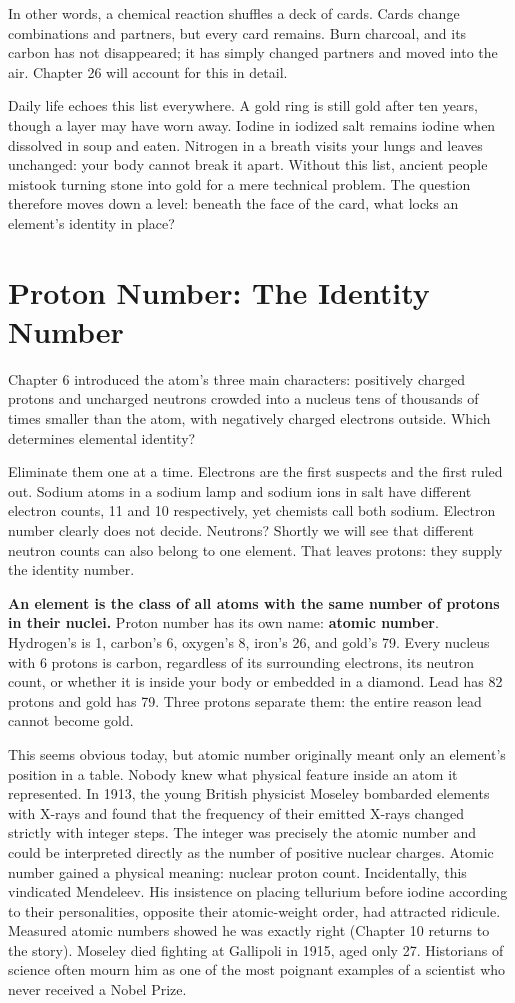 In other words, a chemical reaction shuffles a deck of cards. Cards change combinations and partners, but every card remains. Burn charcoal, and its carbon has not disappeared; it has simply changed partners and moved into the air. Chapter 26 will account for this in detail.

Daily life echoes this list everywhere. A gold ring is still gold after ten years, though a layer may have worn away. Iodine in iodized salt remains iodine when dissolved in soup and eaten. Nitrogen in a breath visits your lungs and leaves unchanged: your body cannot break it apart. Without this list, ancient people mistook turning stone into gold for a mere technical problem. The question therefore moves down a level: beneath the face of the card, what locks an element's identity in place?

\section{Proton Number: The Identity Number}

Chapter 6 introduced the atom's three main characters: positively charged protons and uncharged neutrons crowded into a nucleus tens of thousands of times smaller than the atom, with negatively charged electrons outside. Which determines elemental identity?

Eliminate them one at a time. Electrons are the first suspects and the first ruled out. Sodium atoms in a sodium lamp and sodium ions in salt have different electron counts, 11 and 10 respectively, yet chemists call both sodium. Electron number clearly does not decide. Neutrons? Shortly we will see that different neutron counts can also belong to one element. That leaves protons: they supply the identity number.

\textbf{An element is the class of all atoms with the same number of protons in their nuclei.} Proton number has its own name: \textbf{atomic number}. Hydrogen's is 1, carbon's 6, oxygen's 8, iron's 26, and gold's 79. Every nucleus with 6 protons is carbon, regardless of its surrounding electrons, its neutron count, or whether it is inside your body or embedded in a diamond. Lead has 82 protons and gold has 79. Three protons separate them: the entire reason lead cannot become gold.

This seems obvious today, but atomic number originally meant only an element's position in a table. Nobody knew what physical feature inside an atom it represented. In 1913, the young British physicist Moseley bombarded elements with X-rays and found that the frequency of their emitted X-rays changed strictly with integer steps. The integer was precisely the atomic number and could be interpreted directly as the number of positive nuclear charges. Atomic number gained a physical meaning: nuclear proton count. Incidentally, this vindicated Mendeleev. His insistence on placing tellurium before iodine according to their personalities, opposite their atomic-weight order, had attracted ridicule. Measured atomic numbers showed he was exactly right (Chapter 10 returns to the story). Moseley died fighting at Gallipoli in 1915, aged only 27. Historians of science often mourn him as one of the most poignant examples of a scientist who never received a Nobel Prize.

